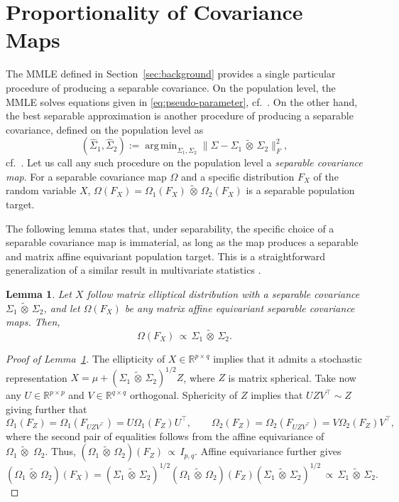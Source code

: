 \documentclass[12pt]{article}
\newcommand{\R}{\mathbb{R}}
\newcommand{\ot}{\,\tilde\otimes\,}
\DeclareMathOperator*{\argmin}{arg\,min}
\newtheorem{lemma}{Lemma}
\begin{document}
\section{Proportionality of Covariance Maps}
\label{sec:covariance_map}

The MMLE defined in Section~\ref{sec:background} provides a single particular procedure of producing a separable covariance. On the population level, the MMLE solves equations given in \eqref{eq:pseudo-parameter}, cf.~\citet{dutilleul1999mle}. On the other hand, the best separable approximation is another procedure of producing a separable covariance, defined on the population level as
\[
(\widehat \Sigma_1, \widehat \Sigma_2) := \argmin_{\Sigma_1,\Sigma_2} \| \Sigma - \Sigma_1 \ot \Sigma_2 \|_F^2,
\]
cf.~\citet{van1993approximation}. Let us call any such procedure on the population level a \emph{separable covariance map}. For a separable covariance map $\Omega$ and a specific distribution $F_X$ of the random variable $X$, $\Omega(F_X) = \Omega_1(F_X) \ot \Omega_2(F_X)$ is a separable population target.

The following lemma states that, under separability, the specific choice of a separable covariance map is immaterial, as long as the map produces a separable and matrix affine equivariant population target. This is a straightforward generalization of a similar result in multivariate statistics \citep[e.g.][]{bilodeau1999theory}.





\begin{lemma}\label{lem:proportionality of the covariances under ellipticity}
    Let $X$ follow matrix elliptical distribution with a separable covariance $\Sigma_1\ot\Sigma_2$,  and let
    $\Omega(F_X)$ be any matrix affine equivariant separable covariance maps. Then, 
\[
    \Omega(F_X) \,\propto\, \Sigma_1\ot\Sigma_2.
\]
\end{lemma}
\begin{proof}[Proof of Lemma~\ref{lem:proportionality of the covariances under ellipticity}]
    The ellipticity of $X\in\R^{p\times q}$ implies that it admits a stochastic representation $X=\mu+(\Sigma_1\ot\Sigma_2)^{1/2}Z$, where $Z$ is matrix spherical. Take now any $U\in\R^{p\times p}$ and $V\in\R^{q\times q}$ orthogonal. Sphericity of $Z$ implies that $UZV^\top\sim Z$ giving further that 
    $$
    \Omega_1(F_Z)=\Omega_1(F_{UZV^\top})=U\Omega_1(F_Z)U^\top,\qquad \Omega_2(F_Z)=\Omega_2(F_{UZV^\top})=V\Omega_2(F_Z)V^\top,
    $$
    where the second pair of equalities follows from the affine equivariance of $\Omega_1\ot\,\Omega_2$. Thus, $(\Omega_1\ot\Omega_2)(F_Z)\,\propto\, I_{p,q}$. Affine equivariance further gives
    $$
    (\Omega_1\ot \Omega_2)(F_X) = (\Sigma_1\ot\Sigma_2)^{1/2}(\Omega_1\ot \Omega_2)(F_Z)(\Sigma_1\ot\Sigma_2)^{1/2}\,\propto\, \Sigma_1\ot\Sigma_2.
    $$
\end{proof}
\end{document}
